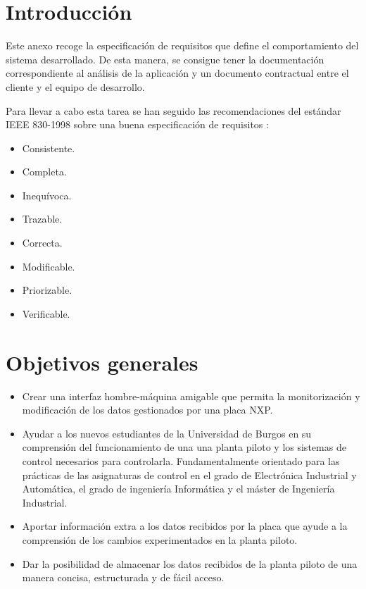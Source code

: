 
\section{Introducción}

Este anexo recoge la especificación de requisitos que define el comportamiento del sistema desarrollado. De esta manera, se consigue tener la documentación correspondiente al análisis de la aplicación y un documento contractual entre el cliente y el equipo de desarrollo.

Para llevar a cabo esta tarea se han seguido las recomendaciones del estándar IEEE 830-1998 sobre una buena especificación de requisitos \cite{web:ieee830}:
\begin{itemize}
	\item Consistente.
	\item Completa.
	\item Inequívoca.
	\item Trazable.
	\item Correcta.
	\item Modificable.
	\item Priorizable.
	\item Verificable.
\end{itemize}

\section{Objetivos generales}

\begin{itemize}
	\item Crear una interfaz hombre-máquina amigable que permita la monitorización y modificación de los datos gestionados por una placa NXP.
	\item Ayudar a los nuevos estudiantes de la Universidad de Burgos en su comprensión del funcionamiento de una una planta piloto y los sistemas de control necesarios para controlarla. Fundamentalmente orientado para las prácticas de las asignaturas de control en el grado de Electrónica Industrial y Automática, el grado de ingeniería Informática y el máster de Ingeniería Industrial.
	\item Aportar información extra a los datos recibidos por la placa que ayude a la comprensión de los cambios experimentados en la planta piloto.
	\item Dar la posibilidad de almacenar los datos recibidos de la planta piloto de una manera concisa, estructurada y de fácil acceso.
\end{itemize}

